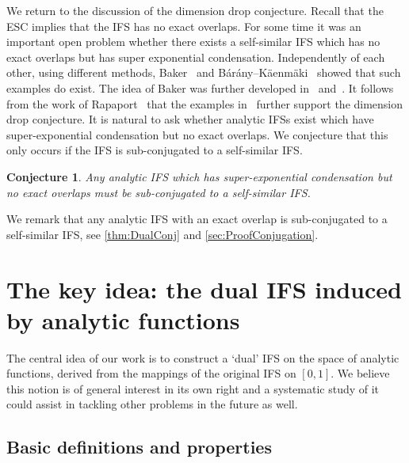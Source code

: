 \documentclass[11pt,a4paper]{article}
\def\cref#1{\ref{#1}}%
\newtheorem{conjecture}[theorem]{Conjecture}
\theoremstyle{definition}
\theoremstyle{remark}
\newcommand{\0}{\mathbf{0}}
\numberwithin{equation}{section}
\begin{document}
We return to the discussion of the dimension drop conjecture. Recall
that the ESC implies that the IFS has no exact overlaps. For some time it was an important open
problem whether there exists a self-similar IFS which has no exact overlaps but has super
exponential condensation. Independently of each other, using different methods,
Baker~\cite{Baker_SuperExpCloseIFS_AdvMath} and
B\'ar\'any--K\"{a}enm\"{a}ki~\cite{BaranyKaenmaki_SuperExpCLoseIFS} showed that such examples do
exist. The idea of Baker was further developed in~\cite{Baker_SuperExpCloseIFS2_ProcAMS}
and~\cite{Chen_SuperExpNoExactOVerlapExample}. It follows from the work of
Rapaport~\cite{Rapaport_ExactOverlapsAlgebraicContr} that the examples
in~\cite{Baker_SuperExpCloseIFS_AdvMath, Baker_SuperExpCloseIFS2_ProcAMS,
Chen_SuperExpNoExactOVerlapExample} further support the dimension drop conjecture. 
It is
natural to ask whether analytic IFSs exist which have super-exponential condensation but no exact
overlaps. We conjecture that this only occurs if the IFS is sub-conjugated to a self-similar IFS.

\begin{conjecture}
Any analytic IFS which has super-exponential condensation but no exact overlaps must be
sub-conjugated to a self-similar IFS.
\end{conjecture}

We remark that any analytic IFS with an exact overlap is sub-conjugated to a self-similar IFS, see
\cref{thm:DualConj} and \cref{sec:ProofConjugation}.




\section{The key idea: the dual IFS induced by analytic functions}\label{sec:DualIFSFull}
The central idea of our work is to construct a `dual' IFS on the space of analytic functions, derived from
the mappings of the original IFS on $[0,1]$.
We believe this notion is of general interest in its own right and a systematic study of it could
assist in tackling other problems in the future as well.

\subsection{Basic definitions and properties}
\end{document}
